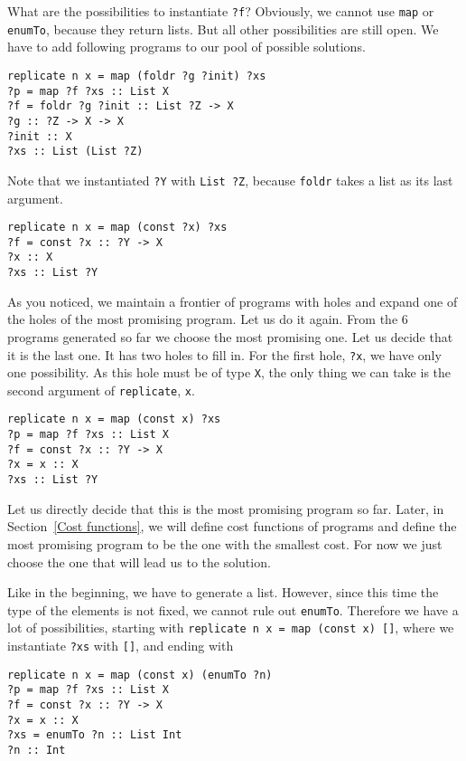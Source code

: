 What are the possibilities to instantiate \lstinline!?f!? Obviously, we cannot use \lstinline?map? or \lstinline?enumTo?, because they return lists. But all other possibilities are still open. We have to add following programs to our pool of possible solutions.

\begin{lstlisting}[style=plain]
replicate n x = map (foldr ?g ?init) ?xs
?p = map ?f ?xs :: List X
?f = foldr ?g ?init :: List ?Z -> X
?g :: ?Z -> X -> X
?init :: X
?xs :: List (List ?Z)
\end{lstlisting}
Note that we instantiated \lstinline!?Y! with \lstinline!List ?Z!, because \lstinline?foldr? takes a list as its last argument.

\begin{lstlisting}[style=plain]
replicate n x = map (const ?x) ?xs
?f = const ?x :: ?Y -> X
?x :: X
?xs :: List ?Y
\end{lstlisting}

As you noticed, we maintain a frontier of programs with holes and expand one of the holes of the most promising program. Let us do it again. From the $6$ programs generated so far we choose the most promising one. Let us decide that it is the last one.
It has two holes to fill in. For the first hole, \lstinline!?x!, we have only one possibility. As this hole must be of type \lstinline?X?, the only thing we can take is the second argument of \lstinline?replicate?, \lstinline?x?.

\begin{lstlisting}[style=plain]
replicate n x = map (const x) ?xs
?p = map ?f ?xs :: List X
?f = const ?x :: ?Y -> X
?x = x :: X
?xs :: List ?Y
\end{lstlisting}

Let us directly decide that this is the most promising program so far. Later, in Section~\ref{Cost functions}, we will define cost functions of programs and define the most promising program to be the one with the smallest cost. For now we just choose the one that will lead us to the solution.

Like in the beginning, we have to generate a list. However, since this time the type of the elements is not fixed, we cannot rule out  \lstinline?enumTo?.
Therefore we have a lot of possibilities, starting with \lstinline?replicate n x = map (const x) []?, where we instantiate \lstinline!?xs! with \lstinline?[]?, and ending with

\begin{lstlisting}[style=plain]
replicate n x = map (const x) (enumTo ?n)
?p = map ?f ?xs :: List X
?f = const ?x :: ?Y -> X
?x = x :: X
?xs = enumTo ?n :: List Int
?n :: Int
\end{lstlisting}

